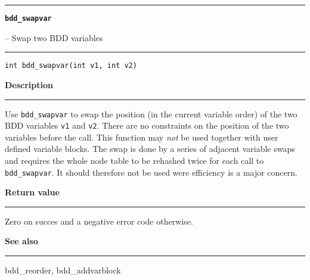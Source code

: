 \begin{minipage}{\textwidth}

\noindent\begin{minipage}{\textwidth}
\rule{\textwidth}{0.5mm}
{\tt\bf bdd\_swapvar }
\--- Swap two BDD variables  \hspace{\fill}
\\\rule[1.5ex]{\textwidth}{0.5mm}
\end{minipage}

\noindent\begin{verbatim}
int bdd_swapvar(int v1, int v2) 
\end{verbatim}

\vspace{\parsep}\noindent
{\bf Description}\\\rule[1.5ex]{\textwidth}{0.2mm}\vspace{-1.5ex}\setlength{\parindent}{1em}
Use {\tt bdd\_swapvar} to swap the position (in the current
           variable order) of the two BDD
           variables {\tt v1} and {\tt v2}. There are no constraints on the
	   position of the two variables before the call. This function may
	   {\em not} be used together with user defined variable blocks.
	   The swap is done by a series of adjacent variable swaps and
	   requires the whole node table to be rehashed twice for each call
	   to {\tt bdd\_swapvar}. It should therefore not be used were
	   efficiency is a major concern. 

\setlength{\parindent}{0em}\vspace{\parsep}\vspace{\baselineskip}\noindent
{\bf Return value}\\\rule[1.5ex]{\textwidth}{0.2mm}\vspace{-1.5ex}
Zero on succes and a negative error code otherwise. 

\vspace{\parsep}\vspace{\baselineskip}\noindent
{\bf See also}\\\rule[1.5ex]{\textwidth}{0.2mm}\vspace{-1.5ex}
bdd\_reorder, bdd\_addvarblock 
\end{minipage}
\vspace{8ex}
